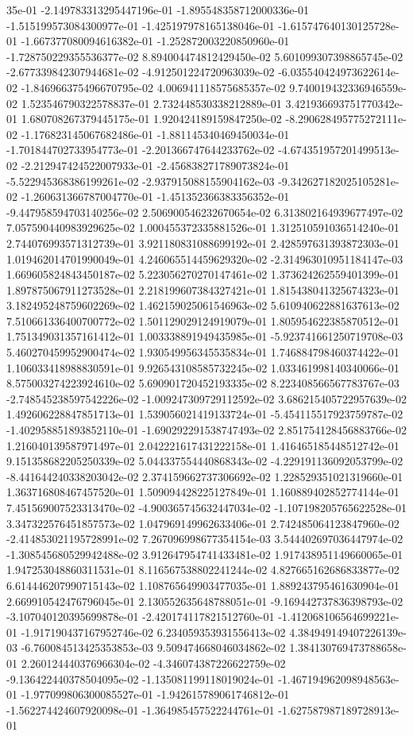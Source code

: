 35e-01	-2.149783313295447196e-01	-1.895548358712000336e-01	-1.515199573084300977e-01	-1.425197978165138046e-01	-1.615747640130125728e-01	-1.667377080094616382e-01	-1.252872003220850960e-01	-1.728750229355536377e-02	8.894004474812429450e-02	5.601099307398865745e-02	-2.677339842307944681e-02	-4.912501224720963039e-02	-6.035540424973622614e-02	-1.846966375496670795e-02	4.006941118575685357e-02	9.740019432336946559e-02	1.523546790322578837e-01	2.732448530338212889e-01	3.421936693751770342e-01	1.680708267379445175e-01	1.920424189159847250e-02	-8.290628495775272111e-02	-1.176823145067682486e-01	-1.881145340469450034e-01	-1.701844702733954773e-01	-2.201366747644233762e-02	-4.674351957201499513e-02	-2.212947424522007933e-01	-2.456838271789073824e-01	-5.522945368386199261e-02	-2.937915088155904162e-03	-9.342627182025105281e-02	-1.260631366787004770e-01	-1.451352366383356352e-01	-9.447958594703140256e-02	2.506900546232670654e-02	6.313802164939677497e-02	7.057590440983929625e-02	1.000455372335881526e-01	1.312510591036514240e-01	2.744076993571312739e-01	3.921180831088699192e-01	2.428597631393872303e-01	1.019462014701990049e-01	4.246065514459629320e-02	-2.314963010951184147e-03	1.669605824843450187e-02	5.223056270270147461e-02	1.373624262559401399e-01	1.897875067911273528e-01	2.218199607384327421e-01	1.815438041325674323e-01	3.182495248759602269e-02	1.462159025061546963e-02	5.610940622881637613e-02	7.510661336400700772e-02	1.501129029124919079e-01	1.805954622385870512e-01	1.751349031357161412e-01	1.003338891949435985e-01	-5.923741661250719708e-03	5.460270459952900474e-02	1.930549956345535834e-01	1.746884798460374422e-01	1.106033418988830591e-01	9.926543108585732245e-02	1.033461998140340066e-01	8.575003274223924610e-02	5.690901720452193335e-02	8.223408566567783767e-03	-2.748545238597542226e-02	-1.009247309729112592e-02	3.686215405722957639e-02	1.492606228847851713e-01	1.539056021419133724e-01	-5.454115517923759787e-02	-1.402958851893852110e-01	-1.690292291538747493e-02	2.851754128456883766e-02	1.216040139587971497e-01	2.042221617431222158e-01	1.416465185448512742e-01	9.151358682205250339e-02	5.044337554440868343e-02	-4.229191136092053799e-02	-8.441644240338203042e-02	2.374159662737306692e-02	1.228529351021319660e-01	1.363716808467457520e-01	1.509094428225127849e-01	1.160889402852774144e-01	7.451569007523313470e-02	-4.900365745632447034e-02	-1.107198205765622528e-01	3.347322576451857573e-02	1.047969149962633406e-01	2.742485064123847960e-02	-2.414853021195728991e-02	7.267096998677354154e-03	3.544402697036447974e-02	-1.308545680529942488e-02	3.912647954741433481e-02	1.917438951149660065e-01	1.947253048860311531e-01	8.116567538802241244e-02	4.827665162686833877e-02	6.614446207990715143e-02	1.108765649903477035e-01	1.889243795461630904e-01	2.669910542476796045e-01	2.130552635648788051e-01	-9.169442737836398793e-02	-3.107040120395699878e-01	-2.420174117821512760e-01	-1.412068106564699221e-01	-1.917190437167952746e-02	6.234059353931556413e-02	4.384949149407226139e-03	-6.760084513425353853e-03	9.509474668046034862e-02	1.384130769473788658e-01	2.260124440376966304e-02	-4.346074387226622759e-02	-9.136422440378504095e-02	-1.135081199118019024e-01	-1.467194962098948563e-01	-1.977099806300085527e-01	-1.942615789061746812e-01	-1.562274424607920098e-01	-1.364985457522244761e-01	-1.627587987189728913e-01	